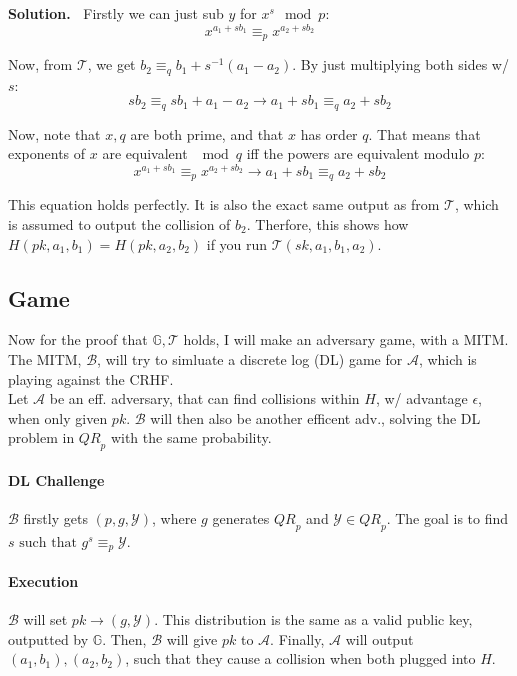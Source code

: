 \documentclass[12pt]{article}
\theoremstyle{definition}
\newcommand{\addbigskip}{\addvspace{\bigskipamount}}
\newenvironment{solution}
     {\addbigskip
      \noindent\color{blue}\textbf{Solution.\ }}
     {\par\addbigskip}
\newenvironment{solution}
     {\comment}
     {\endcomment}
\newcommand{\pk}{\mathit{pk}}
\newcommand{\sk}{\mathit{sk}}
\newcommand{\qrp}{\mathit{QR}_p}
\newcommand{\A}{\mathcal{A}}
\newcommand{\G}{\mathbb{G}}
\newcommand{\Y}{\mathcal{Y}}
\newcommand{\T}{\mathcal{T}}
\newcommand{\B}{\mathcal{B}}
\begin{document}
\begin{solution}
\noindent Firstly we can just sub $y$ for $x^s \mod p$:
\begin{equation*}
    x^{a_1 + sb_1} \equiv_p x^{a_2 + sb_2}
\end{equation*}

\noindent Now, from $\T$, we get $b_2 \equiv_q b_1 + s^{-1}(a_1 - a_2)$. By just multiplying both sides w/ $s$:
\begin{equation*}
    sb_2 \equiv_q sb_1 + a_1 - a_2 \to a_1 + sb_1 \equiv_q a_2 + sb_2
\end{equation*}

\noindent Now, note that $x, q$ are both prime, and that $x$ has order $q$. That means that exponents of $x$ are equivalent $\mod q$ iff the powers are equivalent modulo $p$:
\begin{equation*}
    x^{a_1 + sb_1} \equiv_p x^{a_2 + sb_2} \to a_1 + sb_1 \equiv_q a_2 + sb_2
\end{equation*}

\noindent This equation holds perfectly. It is also the exact same output as from $\T$, which is assumed to output the collision of $b_2$. Therfore, this shows how $H(\pk, a_1, b_1) = H(\pk, a_2, b_2)$ if you run $\T(\sk, a_1, b_1, a_2)$.

\subsection*{Game}
Now for the proof that $\G, \T$ holds, I will make an adversary game, with a MITM. The MITM, $\B$, will try to simluate a discrete log (DL) game for $\A$, which is playing against the CRHF.\\

\noindent Let $\A$ be an eff. adversary, that can find collisions within $H$, w/ advantage $\epsilon$, when only given $\pk$. $\B$ will then also be another efficent adv., solving the DL problem in $\qrp$ with the same probability.

\paragraph{DL Challenge} $\B$ firstly gets $(p, g, \Y)$, where $g$ generates $\qrp$ and $\Y \in \qrp$. The goal is to find $s \text{ such that } g^s \equiv_p \Y$.

\paragraph{Execution} $\B$ will set $\pk \rightarrow (g, \Y)$. This distribution is the same as a valid public key, outputted by $\G$. Then, $\B$ will give $\pk$ to $\A$. Finally, $\A$ will output $(a_1, b_1), (a_2, b_2)$, such that they cause a collision when both plugged into $H$.


\end{solution}
\end{document}
